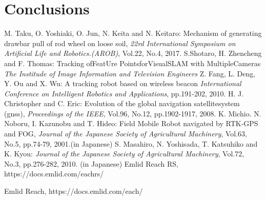 \documentclass[a4paper]{article}
\begin{document}
\section{Conclusions}

\begin{thebibliography}{99}
M. Taku, O. Yoshiaki, O. Jun, N. Keita and N. Keitaro:
Mechanism of generating drawbar pull of rod wheel on loose soil,
{\it 22rd International Symposium on Artificial Life and Robotics.(AROB)}, Vol.22, No.4, 2017.
S.Shotaro, H. Zhencheng and F. Thomas:
Tracking ofFeatUre PointsforVisualSLAM with MultipleCameras
{\it The Institude of Image Information and Television Engineers}
Z. Fang, L. Deng, Y. Ou and X. Wu:
A tracking robot based on wireless beacon
{\it International Conference on Intelligent Robotics and Applications}, pp.191-202, 2010.
H. J. Christopher and C. Eric:
Evolution of the global navigation satellitesystem (gnss),
{\it Proceedings of the IEEE}, Vol.96, No.12, pp.1902-1917, 2008.
K. Michio. N. Noboru, I. Kazunobu and T. Hideo: 
Field Mobile Robot navigated by RTK-GPS and FOG, 
{\it Journal of the Japanese Society of Agricultural Machinery}, Vol.63, No.5, pp.74-79, 2001.(in Japanese)
S. Masahiro, N. Yoshisada, T. Katsuhiko and K. Kyou: 
{\it Journal of the Japanese Society of Agricultural Machinery}, Vol.72, No.3, pp.276-282, 2010. (in Japanese)
Emlid Reach RS, https://docs.emlid.com/eachrs/

Emlid Reach, https://docs.emlid.com/each/
\end{thebibliography}
\end{document}
